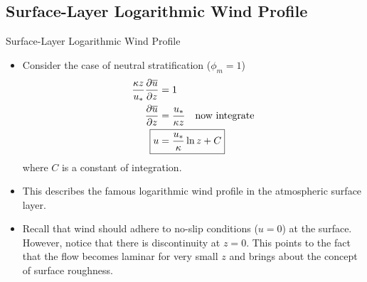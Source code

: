 \subsection{Surface-Layer Logarithmic Wind Profile}
\begin{frame}{Surface-Layer Logarithmic Wind Profile}

\begin{itemize}
	\item Consider the case of neutral stratification ($\phi_m = 1$)
	\begin{align*}
		\frac{\kappa z}{u_*} \frac{\partial \overline{u}}{\partial z} &= 1\\
		\frac{\partial \overline{u}}{\partial z} &= \frac{u_*}{\kappa z} \quad \text{now integrate}\\
		\Aboxed{u &= \frac{u_*}{\kappa}\ln{z} + C}
	\end{align*}
	where $C$ is a constant of integration.
	\item This describes the famous logarithmic wind profile in the atmospheric surface layer.
	\item Recall that wind should adhere to no-slip conditions ($u=0$) at the surface. However, notice that there is discontinuity at $z=0$. This points to the fact that the flow becomes laminar for very small $z$ and brings about the concept of surface roughness.
\end{itemize}
\end{frame}
